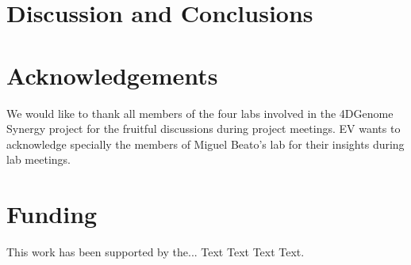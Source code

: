 \documentclass{bioinfo}
\begin{document}
\section{Discussion and Conclusions}


\section*{Acknowledgements}

We would like to thank all members of the four labs involved in the 4DGenome Synergy project for the fruitful discussions during project meetings. EV wants to acknowledge specially the members of Miguel Beato's lab for their insights during lab meetings.

\section*{Funding}

This work has been supported by the... Text Text  Text Text.\vspace*{-12pt}



\end{document}

